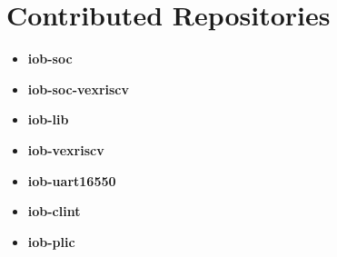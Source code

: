 \chapter{Contributed Repositories}
\begin{itemize}
    \item \textbf{iob-soc}
    \item \textbf{iob-soc-vexriscv}
    \item \textbf{iob-lib}
    \item \textbf{iob-vexriscv}
    \item \textbf{iob-uart16550}
    \item \textbf{iob-clint}
    \item \textbf{iob-plic}
\end{itemize}